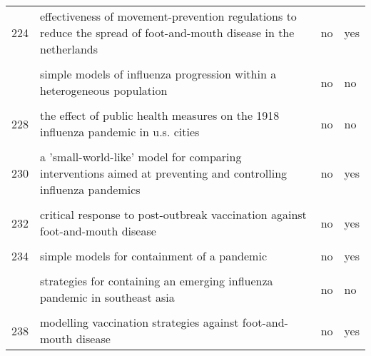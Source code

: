 \documentclass[
]{article}
\begin{document}
\begin{landscape}
\begin{longtable}{l>{\raggedright\arraybackslash}p{4cm}l>{\raggedright\arraybackslash}p{4cm}}
224 & effectiveness of movement-prevention regulations to reduce the spread of foot-and-mouth disease in the netherlands & no & yes\\
\cellcolor{gray!6}{225} & \cellcolor{gray!6}{effects of internal border control on spread of pandemic influenza} & \cellcolor{gray!6}{no} & \cellcolor{gray!6}{no}\\
\addlinespace
226 & simple models of influenza progression within a heterogeneous population & no & no\\
\cellcolor{gray!6}{227} & \cellcolor{gray!6}{stochastic model of an influenza epidemic with drug resistance} & \cellcolor{gray!6}{no} & \cellcolor{gray!6}{no}\\
228 & the effect of public health measures on the 1918 influenza pandemic in u.s. cities & no & no\\
\cellcolor{gray!6}{229} & \cellcolor{gray!6}{vaccinating in disease-free regions: a vaccine model with application to yellow fever} & \cellcolor{gray!6}{no} & \cellcolor{gray!6}{yes}\\
230 & a 'small-world-like' model for comparing interventions aimed at preventing and controlling influenza pandemics & no & yes\\
\addlinespace
\cellcolor{gray!6}{231} & \cellcolor{gray!6}{containing pandemic influenza with antiviral agents: analytical commentary} & \cellcolor{gray!6}{no} & \cellcolor{gray!6}{yes}\\
232 & critical response to post-outbreak vaccination against foot-and-mouth disease & no & yes\\
\cellcolor{gray!6}{233} & \cellcolor{gray!6}{mitigation strategies for pandemic influenza in the united states} & \cellcolor{gray!6}{no} & \cellcolor{gray!6}{yes}\\
234 & simple models for containment of a pandemic & no & yes\\
\cellcolor{gray!6}{235} & \cellcolor{gray!6}{statistical inference in a stochastic epidemic seir model with control intervention: ebola as a case study} & \cellcolor{gray!6}{no} & \cellcolor{gray!6}{no}\\
\addlinespace
236 & strategies for containing an emerging influenza pandemic in southeast asia & no & no\\
\cellcolor{gray!6}{237} & \cellcolor{gray!6}{modeling alternative mitigation strategies for a hypothetical outbreak of foot-and-mouth disease in the united states} & \cellcolor{gray!6}{no} & \cellcolor{gray!6}{yes}\\
238 & modelling vaccination strategies against foot-and-mouth disease & no & yes\\

\end{longtable}
\end{landscape}
\end{document}
